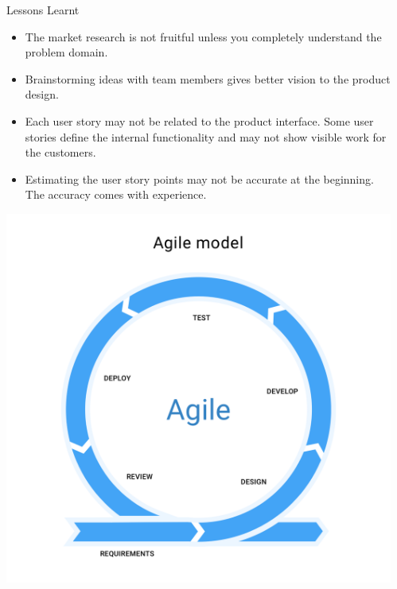 \documentclass[final]{beamer}
\newlength{\sepwid}
\newlength{\onecolwid}
\begin{document}
\begin{frame}
\begin{columns}[t]
\begin{column}{\onecolwid}
\begin{exampleblock}{Lessons Learnt}
\begin{itemize}
    \item The market research is not fruitful unless you completely understand the problem domain.
    \item Brainstorming ideas with team members gives better vision to the product design.
    \item Each user story may not be related to the product interface. Some user stories define the internal functionality and may not show visible work for the customers.
    \item Estimating the user story points may not be accurate at the beginning. The accuracy comes with experience.
\end{itemize}

\end{exampleblock}

\centering
\includegraphics[scale=0.45]{img/agile-model.png}


\end{column} %

\begin{column}{\sepwid}\end{column} %

\end{columns} %

\end{frame} %
\end{document}
